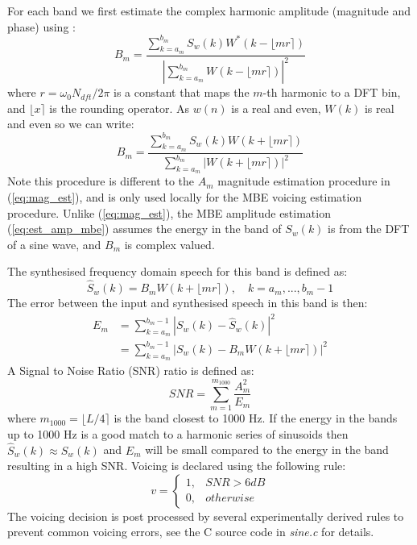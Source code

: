 \documentclass{article}
\begin{document}
For each band we first estimate the complex harmonic amplitude (magnitude and phase) using \cite{griffin1988multiband}:
\begin{equation}
B_m = \frac{\sum_{k=a_m}^{b_m} S_w(k) W^* (k - \lfloor mr \rceil)}{|\sum_{k=a_m}^{b_m} W (k - \lfloor mr \rceil)|^2}
\end{equation}
where $r= \omega_0 N_{dft}/2 \pi$ is a constant that maps the $m$-th harmonic to a DFT bin, and $ \lfloor x \rceil$ is the rounding operator.  As $w(n)$ is a real and even, $W(k)$ is real and even so we can write:
\begin{equation}
\label{eq:est_amp_mbe}
B_m = \frac{\sum_{k=a_m}^{b_m} S_w(k) W (k + \lfloor mr \rceil)}{\sum_{k=a_m}^{b_m} |W (k + \lfloor mr \rceil)|^2}
\end{equation}
Note this procedure is different to the $A_m$ magnitude estimation procedure in (\ref{eq:mag_est}), and is only used locally for the MBE voicing estimation procedure.  Unlike (\ref{eq:mag_est}), the MBE amplitude estimation (\ref{eq:est_amp_mbe}) assumes the energy in the band of $S_w(k)$ is from the DFT of a sine wave, and $B_m$ is complex valued.

The synthesised frequency domain speech for this band is defined as:
\begin{equation}
\hat{S}_w(k) = B_m W(k + \lfloor mr \rceil), \quad k=a_m,...,b_m-1
\end{equation}
The error between the input and synthesised speech in this band is then:
\begin{equation}
\begin{split}
E_m &= \sum_{k=a_m}^{b_m-1} |S_w(k) - \hat{S}_w(k)|^2 \\
    &=\sum_{k=a_m}^{b_m-1} |S_w(k) - B_m W(k + \lfloor mr \rceil)|^2
\end{split}
\end{equation}
A Signal to Noise Ratio (SNR) ratio is defined as:
\begin{equation}
SNR = \sum_{m=1}^{m_{1000}} \frac{A^2_m}{E_m}
\end{equation}
where $m_{1000}= \lfloor L/4 \rceil$ is the band closest to 1000 Hz. If the energy in the bands up to 1000 Hz is a good match to a harmonic series of sinusoids then $\hat{S}_w(k) \approx S_w(k)$ and $E_m$ will be small compared to the energy in the band resulting in a high SNR.  Voicing is declared using the following rule:
\begin{equation}
v = \begin{cases}
    1, & SNR > 6 dB \\
    0, & otherwise
    \end{cases}
\end{equation}
The voicing decision is post processed by several experimentally derived rules to prevent common voicing errors, see the C source code in \emph{sine.c} for details.
\end{document}
